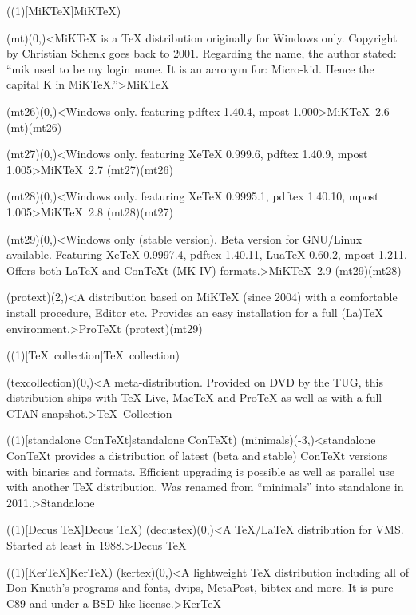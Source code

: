 \tograph(\tostruct(1)[MiK\TeX]{MiK\TeX}){
	\tonode(mt)(0,\layer)<MiKTeX is a TeX distribution originally for Windows only. Copyright by Christian Schenk goes back to 2001. Regarding the name, the author stated: “mik used to be my login name. It is an acronym for: Micro-kid. Hence the capital K in MiKTeX.”>{MiK\TeX}
	\steplayer

	\tonode(mt26)(0,\layer)<Windows only. featuring  pdftex 1.40.4, mpost 1.000>{MiK\TeX\ 2.6}
	\todraw(mt)(mt26)
	\steplayer

	\tonode(mt27)(0,\layer)<Windows only. featuring  XeTeX 0.999.6, pdftex 1.40.9, mpost 1.005>{MiK\TeX\ 2.7}
	\todraw(mt27)(mt26)
	\steplayer

	\tonode(mt28)(0,\layer)<Windows only. featuring  XeTeX 0.9995.1, pdftex 1.40.10, mpost 1.005>{MiK\TeX\ 2.8}
	\todraw(mt28)(mt27)
	\steplayer

	\tonode(mt29)(0,\layer)<Windows only (stable version). Beta version for GNU/Linux available. Featuring XeTeX 0.9997.4, pdftex 1.40.11, LuaTeX 0.60.2, mpost 1.211. Offers both LaTeX and ConTeXt (MK IV) formats.>{MiK\TeX\ 2.9}
	\todraw(mt29)(mt28)
	\steplayer	
	
	\tonode(protext)(2,\layer)<A distribution based on MiKTeX (since 2004) with a comfortable install procedure, Editor etc. Provides an easy installation for a full (La)TeX environment.>{ProTeXt}
	\todraw(protext)(mt29)
}

\tograph(\tostruct(1)[\TeX\ collection]{\TeX\ collection}){
	\tonode(texcollection)(0,\layer)<A meta-distribution. Provided on DVD by the TUG, this distribution ships with TeX Live, MacTeX and ProTeX as well as with a full CTAN snapshot.>{\TeX\ Collection}

}

\tograph(\tostruct(1)[standalone Con\TeX t]{standalone Con\TeX t}){
	\tonode(minimals)(-3,\layer)<standalone ConTeXt provides a distribution of latest (beta and stable) ConTeXt versions with binaries and formats. Efficient upgrading is possible as well as parallel use with another TeX distribution. Was renamed from “minimals” into standalone in 2011.>{Standalone}
}

\tograph(\tostruct(1)[Decus \TeX]{Decus \TeX}){
	\tonode(decustex)(0,\layer)<A TeX/LaTeX distribution for VMS. Started at least in 1988.>{Decus \TeX}
}

\tograph(\tostruct(1)[Ker\TeX]{Ker\TeX}){
	\tonode(kertex)(0,\layer)<A lightweight TeX distribution including all of Don Knuth's programs and fonts, dvips, MetaPost, bibtex and more. It is pure C89 and under a BSD like license.>{Ker\TeX}
}

